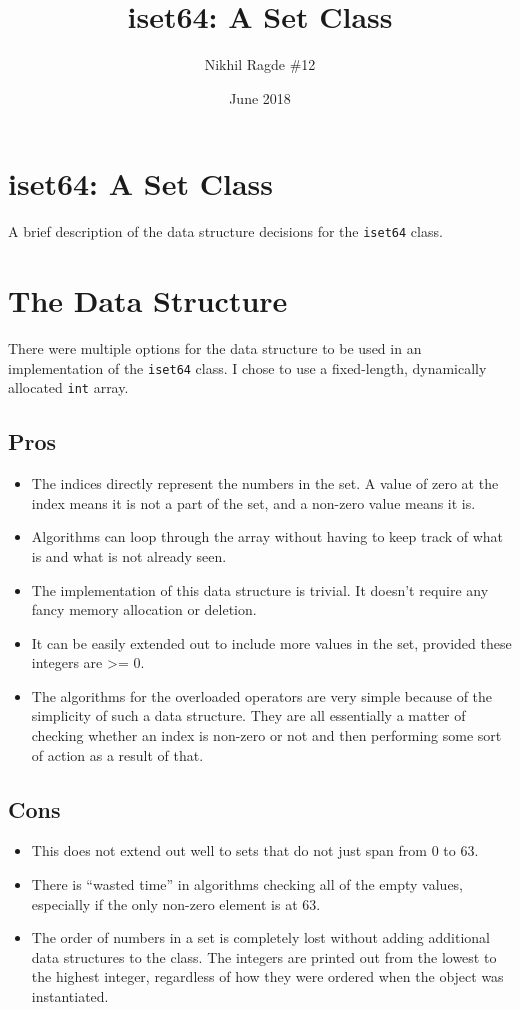\documentclass[12pt, letterpaper]{article}
\title{iset64: A Set Class}
\author{Nikhil Ragde \#12}
\date{June 2018}
\begin{document}
\maketitle
\section*{iset64: A Set Class}
A brief description of the data structure decisions for the \texttt{iset64} class.
\setcounter{section}{0}
\section{The Data Structure}
There were multiple options for the data structure to be used in an implementation of the \texttt{iset64} class. I chose to use a fixed-length, dynamically allocated \texttt{int} array.

\subsection{Pros}
\begin{itemize}
\item The indices directly represent the numbers in the set. A value of zero at the index means it is not a part of the set, and a non-zero value means it is.
\item Algorithms can loop through the array without having to keep track of what is and what is not already seen.
\item The implementation of this data structure is trivial. It doesn't require any fancy memory allocation or deletion.
\item It can be easily extended out to include more values in the set, provided these integers are >= 0.
\item The algorithms for the overloaded operators are very simple because of the simplicity of such a data structure. They are all essentially a matter of checking whether an index is non-zero or not and then performing some sort of action as a result of that.
\end{itemize}

\subsection{Cons}
\begin{itemize}
\item This does not extend out well to sets that do not just span from 0 to 63.
\item There is ``wasted time'' in algorithms checking all of the empty values, especially if the only non-zero element is at 63.
\item The order of numbers in a set is completely lost without adding additional data structures to the class. The integers are printed out from the lowest to the highest integer, regardless of how they were ordered when the object was instantiated.
\end{itemize}
\end{document}
